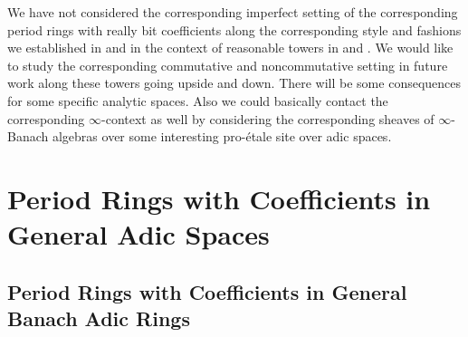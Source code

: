 \documentclass[12pt]{amsart}
\theoremstyle{definition}
\numberwithin{equation}{section}
\begin{document}
\indent We have not considered the corresponding imperfect setting of the corresponding period rings with really bit coefficients along the corresponding style and fashions we established in \cite{T1} and \cite{T2} in the context of reasonable towers in \cite{KL1} and \cite{KL2}. We would like to study the corresponding commutative and noncommutative setting in future work along these towers going upside and down. There will be some consequences for some specific analytic spaces. Also we could basically contact the corresponding $\infty$-context as well by considering the corresponding sheaves of $\infty$-Banach algebras over some interesting pro-\'etale site over adic spaces.\\





\newpage 


\section{Period Rings with Coefficients in General Adic Spaces}


\subsection{Period Rings with Coefficients in General Banach Adic Rings}
\end{document}
